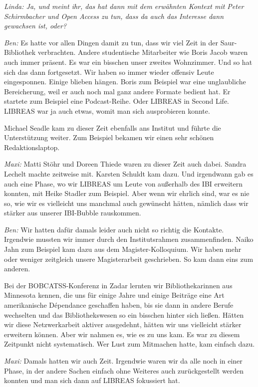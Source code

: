 \documentclass[a4paper,
fontsize=11pt,
oneside,
numbers=noperiodatend,
parskip=half-,
bibliography=totoc,
final
]{scrartcl}
\begin{document}
\emph{Linda: Ja, und meint ihr, das hat dann mit dem erwähnten Kontext
mit Peter Schirmbacher und Open Access zu tun, dass da auch das
Interesse dann gewachsen ist, oder?}

\emph{Ben:} Es hatte vor allen Dingen damit zu tun, dass wir viel Zeit
in der Saur-Bibliothek verbrachten. Andere studentische Mitarbeiter wie
Boris Jacob waren auch immer präsent. Es war ein bisschen unser zweites
Wohnzimmer. Und so hat sich das dann fortgesetzt. Wir haben so immer
wieder offensiv Leute eingesponnen. Einige blieben hängen. Boris zum
Beispiel war eine unglaubliche Bereicherung, weil er auch noch mal ganz
andere Formate bedient hat. Er startete zum Beispiel eine Podcast-Reihe.
Oder LIBREAS in Second Life. LIBREAS war ja auch etwas, womit man sich
ausprobieren konnte.

Michael Seadle kam zu dieser Zeit ebenfalls ans Institut und führte die
Unterstützung weiter. Zum Beispiel bekamen wir einen sehr schönen
Redaktionslaptop.

\emph{Maxi:} Matti Stöhr und Doreen Thiede waren zu dieser Zeit auch
dabei. Sandra Lechelt machte zeitweise mit. Karsten Schuldt kam dazu.
Und irgendwann gab es auch eine Phase, wo wir LIBREAS um Leute von
außerhalb des IBI erweitern konnten, mit Heike Stadler zum Beispiel.
Aber wenn wir ehrlich sind, war es nie so, wie wir es vielleicht uns
manchmal auch gewünscht hätten, nämlich dass wir stärker aus unserer
IBI-Bubble rauskommen.

\emph{Ben:} Wir hatten dafür damals leider auch nicht so richtig die
Kontakte. Irgendwie mussten wir immer durch den Institutsrahmen
zusammenfinden. Naiko Jahn zum Beispiel kam dazu aus dem
Magister-Kolloquium. Wir haben mehr oder weniger zeitgleich unsere
Magisterarbeit geschrieben. So kam dann eins zum anderen.

Bei der BOBCATSS-Konferenz in Zadar lernten wir Bibliothekarinnen aus
Minnesota kennen, die uns für einige Jahre und einige Beiträge eine Art
amerikanische Dépendance geschaffen haben, bis sie dann in andere Berufe
wechselten und das Bibliothekswesen so ein bisschen hinter sich ließen.
Hätten wir diese Netzwerkarbeit aktiver ausgedehnt, hätten wir uns
vielleicht stärker erweitern können. Aber wir nahmen es, wie es zu uns
kam. Es war zu diesem Zeitpunkt nicht systematisch. Wer Lust zum
Mitmachen hatte, kam einfach dazu.

\emph{Maxi:} Damals hatten wir auch Zeit. Irgendwie waren wir da alle
noch in einer Phase, in der andere Sachen einfach ohne Weiteres auch
zurückgestellt werden konnten und man sich dann auf LIBREAS fokussiert
hat.
\end{document}
